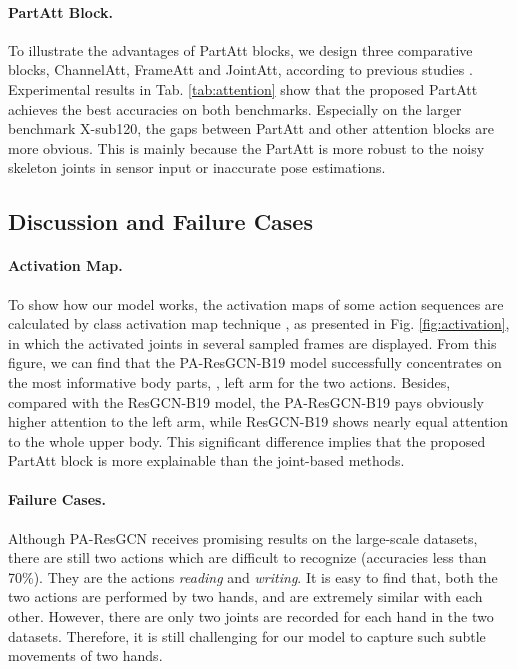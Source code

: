 \documentclass[sigconf]{acmart}
\begin{document}
\paragraph{PartAtt Block.} To illustrate the advantages of PartAtt blocks, we design three comparative blocks, \ie ChannelAtt, FrameAtt and JointAtt, according to previous studies \cite{song2017end, woo2018cbam}. Experimental results in Tab. \ref{tab:attention} show that the proposed PartAtt achieves the best accuracies on both benchmarks. Especially on the larger benchmark X-sub120, the gaps between PartAtt and other attention blocks are more obvious. This is mainly because the PartAtt is more robust to the noisy skeleton joints in sensor input or inaccurate pose estimations.

\subsection{Discussion and Failure Cases}
\label{ssec:discuss}

\paragraph{Activation Map.} To show how our model works, the activation maps of some action sequences are calculated by class activation map technique \cite{learning2016zhou}, as presented in Fig. \ref{fig:activation}, in which the activated joints in several sampled frames are displayed. From this figure, we can find that the PA-ResGCN-B19 model successfully concentrates on the most informative body parts, \ie, left arm for the two actions. Besides, compared with the ResGCN-B19 model, the PA-ResGCN-B19 pays obviously higher attention to the left arm, while ResGCN-B19 shows nearly equal attention to the whole upper body. This significant difference implies that the proposed PartAtt block is more explainable than the joint-based methods.

\paragraph{Failure Cases.} Although PA-ResGCN receives promising results on the large-scale datasets, there are still two actions which are difficult to recognize (accuracies less than 70\%). They are the actions {\it reading} and {\it writing}. It is easy to find that, both the two actions are performed by two hands, and are extremely similar with each other. However, there are only two joints are recorded for each hand in the two datasets. Therefore, it is still challenging for our model to capture such subtle movements of two hands.
\end{document}
